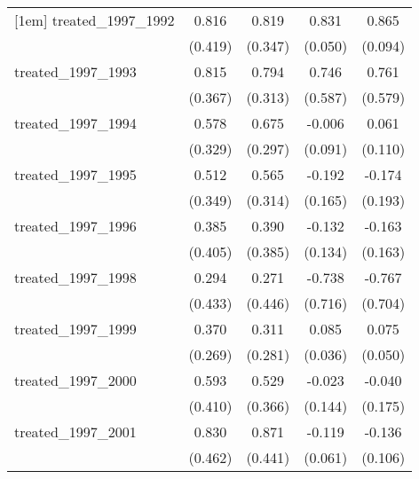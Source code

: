 {\begin{tabular}{l*{4}{c}}
[1em]
treated\_1997\_1992&       0.816         &       0.819\sym{*}  &       0.831\sym{***}&       0.865\sym{***}\\
            &     (0.419)         &     (0.347)         &     (0.050)         &     (0.094)         \\
[1em]
treated\_1997\_1993&       0.815\sym{*}  &       0.794\sym{*}  &       0.746         &       0.761         \\
            &     (0.367)         &     (0.313)         &     (0.587)         &     (0.579)         \\
[1em]
treated\_1997\_1994&       0.578         &       0.675\sym{*}  &      -0.006         &       0.061         \\
            &     (0.329)         &     (0.297)         &     (0.091)         &     (0.110)         \\
[1em]
treated\_1997\_1995&       0.512         &       0.565         &      -0.192         &      -0.174         \\
            &     (0.349)         &     (0.314)         &     (0.165)         &     (0.193)         \\
[1em]
treated\_1997\_1996&       0.385         &       0.390         &      -0.132         &      -0.163         \\
            &     (0.405)         &     (0.385)         &     (0.134)         &     (0.163)         \\
[1em]
treated\_1997\_1998&       0.294         &       0.271         &      -0.738         &      -0.767         \\
            &     (0.433)         &     (0.446)         &     (0.716)         &     (0.704)         \\
[1em]
treated\_1997\_1999&       0.370         &       0.311         &       0.085\sym{*}  &       0.075         \\
            &     (0.269)         &     (0.281)         &     (0.036)         &     (0.050)         \\
[1em]
treated\_1997\_2000&       0.593         &       0.529         &      -0.023         &      -0.040         \\
            &     (0.410)         &     (0.366)         &     (0.144)         &     (0.175)         \\
[1em]
treated\_1997\_2001&       0.830         &       0.871\sym{*}  &      -0.119         &      -0.136         \\
            &     (0.462)         &     (0.441)         &     (0.061)         &     (0.106)         \\

\end{tabular}}
